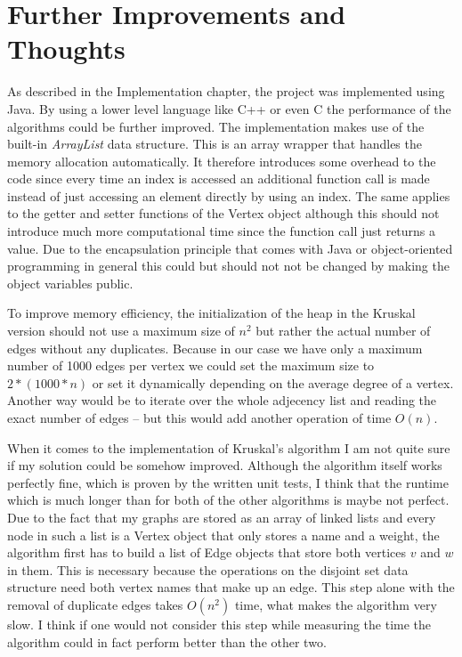 \documentclass{article}
\begin{document}
\section{Further Improvements and Thoughts}
As described in the Implementation chapter, the project was implemented using Java. By using a lower level language like C++ or even C the performance of the algorithms could be further improved. 
The implementation makes use of the built-in \textit{ArrayList} data structure. This is an array wrapper that handles the memory allocation automatically. It therefore introduces some overhead to the code since every time an index is accessed an additional function call is made instead of just accessing an element directly by using an index. The same applies to the getter and setter functions of the Vertex object although this should not introduce much more computational time since the function call just returns a value. Due to the encapsulation principle that comes with Java or object-oriented programming in general this could but should not not be changed by making the object variables public.

To improve memory efficiency, the initialization of the heap in the Kruskal version should not use a maximum size of $n^2$ but rather the actual number of edges without any duplicates. Because in our case we have only a maximum number of 1000 edges per vertex we could set the maximum size to $2 * (1000 * n)$ or set it dynamically depending on the average degree of a vertex. Another way would be to iterate over the whole adjecency list and reading the exact number of edges – but this would add another operation of time $O(n)$.

When it comes to the implementation of Kruskal's algorithm I am not quite sure if my solution could be somehow improved. Although the algorithm itself works perfectly fine, which is proven by the written unit tests, I think that the runtime which is much longer than for both of the other algorithms is maybe not perfect. 
Due to the fact that my graphs are stored as an array of linked lists and every node in such a list is a Vertex object that only stores a name and a weight, the algorithm first has to build a list of Edge objects that store both vertices $v$ and $w$ in them. This is necessary because the operations on the disjoint set data structure need both vertex names that make up an edge. This step alone with the removal of duplicate edges takes $O(n^2)$ time, what makes the algorithm very slow. I think if one would not consider this step while measuring the time the algorithm could in fact perform better than the other two.
\end{document}
